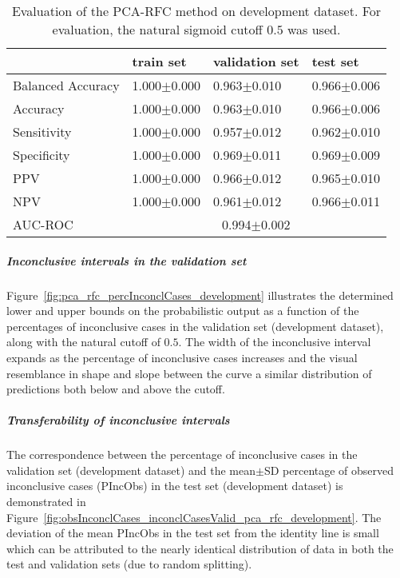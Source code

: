 \begin{table}[ht]
  \caption{Evaluation of the PCA-RFC method on development dataset. 
  For evaluation, the natural sigmoid cutoff $0.5$ was used.}
  \centering
  \begin{tabular}{llll}
      \hline
                        & train set         & validation set      & test set             \\
      \hline
      Balanced Accuracy & 1.000$\pm$0.000   &   0.963$\pm$0.010    &  0.966$\pm$0.006   \\
      Accuracy          & 1.000$\pm$0.000    &   0.963$\pm$0.010  &  0.966$\pm$0.006    \\
      Sensitivity       &  1.000$\pm$0.000   &   0.957$\pm$0.012   &  0.962$\pm$0.010   \\
      Specificity       & 1.000$\pm$0.000    &   0.969$\pm$0.011  &  0.969$\pm$0.009   \\
      PPV               &  1.000$\pm$0.000   &   0.966$\pm$0.012   &  0.965$\pm$0.010   \\
      NPV               &  1.000$\pm$0.000   &   0.961$\pm$0.012  &  0.966$\pm$0.011   \\
      \hline
      AUC-ROC          &  \multicolumn{3}{c}{0.994$\pm$0.002}  \\
      \hline
  \end{tabular}
 \label{t1:erc_perf_eval_table}
\end{table}


\subparagraph{Inconclusive intervals in the validation set}

Figure~\ref{fig:pca_rfc_percInconclCases_development} illustrates the determined lower and upper bounds on the 
probabilistic output as a function of the percentages of inconclusive cases in the validation set (development dataset), 
along with the natural cutoff of $0.5$.
The width of the inconclusive interval expands as the percentage of inconclusive cases increases 
and the visual resemblance in shape and slope between the curve a similar distribution of predictions both below and above the cutoff.

\subparagraph{Transferability of inconclusive intervals}

The correspondence between the percentage of inconclusive cases in the validation set (development dataset) and 
the mean$\pm$SD percentage of observed inconclusive cases (PIncObs) in the test set (development dataset) 
is demonstrated in Figure~\ref{fig:obsInconclCases_inconclCasesValid_pca_rfc_development}.
The deviation of the mean PIncObs in the test set from the 
identity line is small which can be attributed to the nearly identical distribution of data in both the test and validation sets 
(due to random splitting).


